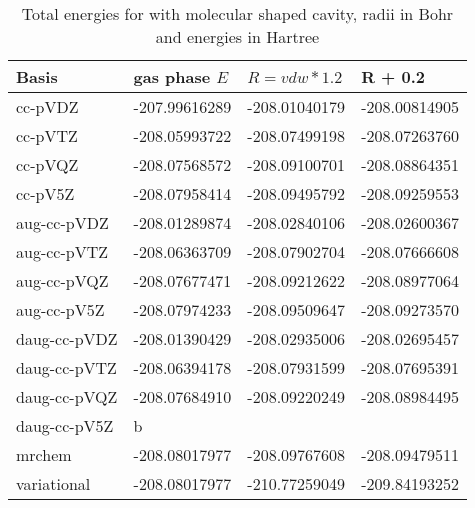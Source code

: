 \documentclass[../master_thesis.tex]{subfiles}
\begin{document}
\begin{table}[htbp]
\caption{Total energies for  with molecular shaped cavity, radii in Bohr and energies in Hartree}
\begin{tabular}{l|r|r|r}
Basis & \multicolumn{1}{l|}{gas phase $E$} & \multicolumn{1}{l|}{$R = vdw*1.2$} & \multicolumn{1}{l|}{R + 0.2} \\ \hline
cc-pVDZ & -207.99616289 & -208.01040179 & -208.00814905 \\
cc-pVTZ & -208.05993722 & -208.07499198 & -208.07263760 \\
cc-pVQZ & -208.07568572 & -208.09100701 & -208.08864351 \\
cc-pV5Z & -208.07958414 & -208.09495792 & -208.09259553 \\ \hline
aug-cc-pVDZ & -208.01289874 & -208.02840106 & -208.02600367 \\
aug-cc-pVTZ & -208.06363709 & -208.07902704 & -208.07666608 \\
aug-cc-pVQZ & -208.07677471 & -208.09212622 & -208.08977064 \\
aug-cc-pV5Z & -208.07974233 & -208.09509647 & -208.09273570 \\ \hline
daug-cc-pVDZ & -208.01390429 & -208.02935006 & -208.02695457 \\
daug-cc-pVTZ & -208.06394178 & -208.07931599 & -208.07695391 \\
daug-cc-pVQZ & -208.07684910 & -208.09220249 & -208.08984495 \\
daug-cc-pV5Z & \multicolumn{1}{l|}{b} & \multicolumn{1}{l|}{} & \multicolumn{1}{l|}{} \\ \hline
mrchem & -208.08017977 & -208.09767608 & -208.09479511 \\
variational & -208.08017977 & -210.77259049 & -209.84193252 \\
\end{tabular}
\label{tab:acetamidrawdataabc}
\end{table}
\end{document}
